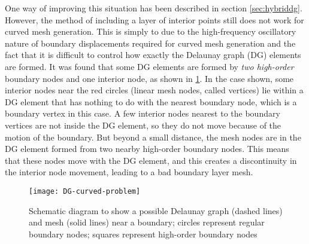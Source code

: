 One way of improving this situation has been described in section \ref{sec:hybriddg}. However, the method of including a layer of interior points still does not work for curved mesh generation. This is simply to due to the high-frequency oscillatory nature of boundary displacements required for curved mesh generation and the fact that it is difficult to control how exactly the Delaunay graph (DG) elements are formed. It was found that some DG elements are formed by \emph{two high-order} boundary nodes and one interior node, as shown in \ref{fig:dg-curved-problem}. In the case shown, some interior nodes near the red circles (linear mesh nodes, called vertices) lie within a DG element that has nothing to do with the nearest boundary node, which is a boundary vertex in this case. A few interior nodes nearest to the boundary vertices are not inside the DG element, so they do not move because of the motion of the boundary. But beyond a small distance, the mesh nodes are in the DG element formed from two nearby high-order boundary nodes. This means that these nodes move with the DG element, and this creates a discontinuity in the interior node movement, leading to a bad boundary layer mesh.
\begin{figure}[!h]
	\centering
	\texttt{[image: DG-curved-problem]}
	\caption{Schematic diagram to show a possible Delaunay graph (dashed lines) and mesh (solid lines) near a boundary; circles represent regular boundary nodes; squares represent high-order boundary nodes}
	\label{fig:dg-curved-problem}
\end{figure}